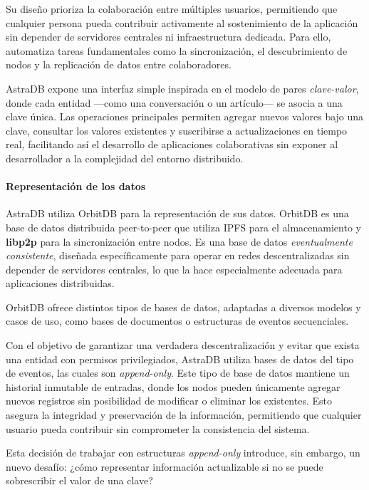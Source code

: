 Su diseño prioriza la colaboración entre múltiples usuarios, permitiendo que cualquier persona pueda contribuir activamente al sostenimiento de la aplicación sin depender de servidores centrales ni infraestructura dedicada. Para ello, automatiza tareas fundamentales como la sincronización, el descubrimiento de nodos y la replicación de datos entre colaboradores.

AstraDB expone una interfaz simple inspirada en el modelo de pares \textit{clave-valor}, donde cada entidad —como una conversación o un artículo— se asocia a una clave única. Las operaciones principales permiten agregar nuevos valores bajo una clave, consultar los valores existentes y suscribirse a actualizaciones en tiempo real, facilitando así el desarrollo de aplicaciones colaborativas sin exponer al desarrollador a la complejidad del entorno distribuido.

\paragraph{Representación de los datos}

AstraDB utiliza OrbitDB para la representación de sus datos. OrbitDB es una base de datos distribuida peer-to-peer que utiliza IPFS para el almacenamiento y \textbf{libp2p} \cite{libp2p} para la sincronización entre nodos. Es una base de datos \textit{eventualmente consistente}, diseñada específicamente para operar en redes descentralizadas sin depender de servidores centrales, lo que la hace especialmente adecuada para aplicaciones distribuidas.

OrbitDB ofrece distintos tipos de bases de datos, adaptadas a diversos modelos y casos de uso, como bases de documentos o estructuras de eventos secuenciales.

Con el objetivo de garantizar una verdadera descentralización y evitar que exista una entidad con permisos privilegiados, AstraDB utiliza bases de datos del tipo de eventos, las cuales son \textit{append-only}. Este tipo de base de datos mantiene un historial inmutable de entradas, donde los nodos pueden únicamente agregar nuevos registros sin posibilidad de modificar o eliminar los existentes. Esto asegura la integridad y preservación de la información, permitiendo que cualquier usuario pueda contribuir sin comprometer la consistencia del sistema.

Esta decisión de trabajar con estructuras \textit{append-only} introduce, sin embargo, un nuevo desafío: ¿cómo representar información actualizable si no se puede sobrescribir el valor de una clave?

